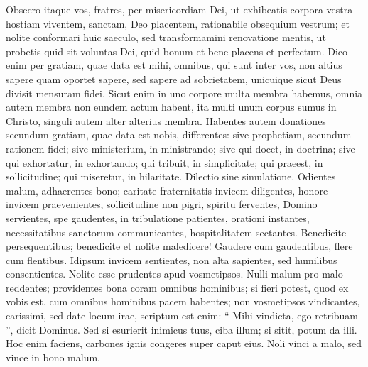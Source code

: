 \begin{biblechapter}
\begin{biblechapter}
\begin{biblechapter}
\begin{biblechapter}
\begin{biblechapter}
\begin{biblechapter}
\begin{biblechapter}
\begin{biblechapter}
\begin{biblechapter}
\begin{biblechapter}
\begin{biblechapter}
\begin{biblechapter}
\verse Obsecro itaque vos, fratres, per misericordiam Dei, ut exhibeatis corpora vestra hostiam viventem, sanctam, Deo placentem, rationabile obsequium vestrum; 
 \verse et nolite conformari huic saeculo, sed transformamini renovatione mentis, ut probetis quid sit voluntas Dei, quid bonum et bene placens et perfectum.
 \verse Dico enim per gratiam, quae data est mihi, omnibus, qui sunt inter vos, non altius sapere quam oportet sapere, sed sapere ad sobrietatem, unicuique sicut Deus divisit mensuram fidei. 
\verse Sicut enim in uno corpore multa membra habemus, omnia autem membra non eundem actum habent, 
\verse ita multi unum corpus sumus in Christo, singuli autem alter alterius membra. 
\verse Habentes autem donationes secundum gratiam, quae data est nobis, differentes: sive prophetiam, secundum rationem fidei; 
\verse sive ministerium, in ministrando; sive qui docet, in doctrina; 
\verse sive qui exhortatur, in exhortando; qui tribuit, in simplicitate; qui praeest, in sollicitudine; qui miseretur, in hilaritate.
 \verse Dilectio sine simulatione. Odientes malum, adhaerentes bono; 
\verse caritate fraternitatis invicem diligentes, honore invicem praevenientes, 
\verse sollicitudine non pigri, spiritu ferventes, Domino servientes, 
\verse spe gaudentes, in tribulatione patientes, orationi instantes, 
\verse necessitatibus sanctorum communicantes, hospitalitatem sectantes. 
\verse Benedicite persequentibus; benedicite et nolite maledicere! 
\verse Gaudere cum gaudentibus, flere cum flentibus. 
\verse Idipsum invicem sentientes, non alta sapientes, sed humilibus consentientes. Nolite esse prudentes apud vosmetipsos.
 \verse Nulli malum pro malo reddentes; providentes bona coram omnibus hominibus; 
 \verse si fieri potest, quod ex vobis est, cum omnibus hominibus pacem habentes; 
 \verse non vosmetipsos vindicantes, carissimi, sed date locum irae, scriptum est enim: “ Mihi vindicta, ego retribuam ”, dicit Dominus. 
\verse Sed si esurierit inimicus tuus, ciba illum; si sitit, potum da illi. Hoc enim faciens, carbones ignis congeres super caput eius. 
\verse Noli vinci a malo, sed vince in bono malum.
 

\end{biblechapter}
\end{biblechapter}
\end{biblechapter}
\end{biblechapter}
\end{biblechapter}
\end{biblechapter}
\end{biblechapter}
\end{biblechapter}
\end{biblechapter}
\end{biblechapter}
\end{biblechapter}
\end{biblechapter}
